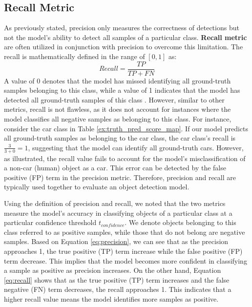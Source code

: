 \subsection{Recall Metric}  \label{subsec:recall_metric}
As previously stated, precision only measures the correctness of detections but not the model's ability to detect all samples of a particular class. \textbf{Recall metric} are often utilized in conjunction with precision to overcome this limitation. The recall is mathematically defined in the range of $[0,1]$ as:
\begin{equation}
    Recall = \frac{TP}{TP+FN} \label{eq:recall}
\end{equation}
A value of 0 denotes that the model has missed identifying all ground-truth samples belonging to this class, while a value of 1 indicates that the model has detected all ground-truth samples of this class \cite{metrics_survey_2020}. However, similar to other metrics, recall is not flawless, as it does not account for instances where the model classifies all negative samples as belonging to this class. For instance, consider the car class in Table \ref{ex:truth_pred_score_map}. If our model predicts all ground-truth samples as belonging to the car class, the car class's recall is $\frac{3}{3+0}=1$, suggesting that the model can identify all ground-truth cars. However, as illustrated, the recall value fails to account for the model's misclassification of a non-car (human) object as a car. This error can be detected by the false positive (FP) term in the precision metric. Therefore, precision and recall are typically used together to evaluate an object detection model.

Using the definition of precision and recall, we noted that the two metrics measure the model's accuracy in classifying objects of a particular class at a particular confidence threshold $t_{confidence}$. We denote objects belonging to this class referred to as positive samples, while those that do not belong are negative samples. Based on Equation \ref{eq:precision}, we can see that as the precision approaches 1, the true positive (TP) term increase while the false positive (FP) term decrease. This implies that the model becomes more confident in classifying a sample as positive as precision increases. On the other hand, Equation \ref{eq:recall} shows that as the true positive (TP) term increases and the false negative (FN) term decreases, the recall approaches 1. This indicates that a higher recall value means the model identifies more samples as positive. 

